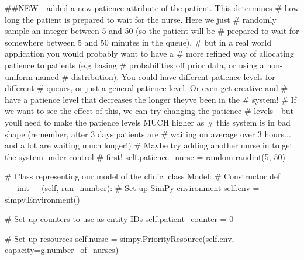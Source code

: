 \documentclass[
  letterpaper,
  DIV=11,
  numbers=noendperiod]{scrreprt}
\newenvironment{Shaded}{}{}
\newcommand{\CommentTok}[1]{\textcolor[rgb]{0.42,0.45,0.49}{#1}}
\newcommand{\DecValTok}[1]{\textcolor[rgb]{0.00,0.36,0.77}{#1}}
\newcommand{\FunctionTok}[1]{\textcolor[rgb]{0.44,0.26,0.76}{#1}}
\newcommand{\KeywordTok}[1]{\textcolor[rgb]{0.84,0.23,0.29}{#1}}
\newcommand{\NormalTok}[1]{\textcolor[rgb]{0.14,0.16,0.18}{#1}}
\newcommand{\OperatorTok}[1]{\textcolor[rgb]{0.14,0.16,0.18}{#1}}
\newcommand{\VariableTok}[1]{\textcolor[rgb]{0.89,0.38,0.04}{#1}}
\begin{document}
\begin{tcolorbox}
\begin{Shaded}
\begin{Highlighting}[]
        \CommentTok{\#\#NEW {-} added a new patience attribute of the patient.  This determines}
        \CommentTok{\# how long the patient is prepared to wait for the nurse.  Here we just}
        \CommentTok{\# randomly sample an integer between 5 and 50 (so the patient will be}
        \CommentTok{\# prepared to wait for somewhere between 5 and 50 minutes in the queue),}
        \CommentTok{\# but in a real world application you would probably want to have a}
        \CommentTok{\# more refined way of allocating patience to patients (e.g basing}
        \CommentTok{\# probabilities off prior data, or using a non{-}uniform named}
        \CommentTok{\# distribution).  You could have different patience levels for different}
        \CommentTok{\# queues, or just a general patience level.  Or even get creative and}
        \CommentTok{\# have a patience level that decreases the longer they\textquotesingle{}ve been in the}
        \CommentTok{\# system!}
        \CommentTok{\# If we want to see the effect of this, we can try changing the patience}
        \CommentTok{\# levels {-} but you\textquotesingle{}ll need to make the patience levels MUCH higher as}
        \CommentTok{\# this system is in bad shape (remember, after 3 days patients are}
        \CommentTok{\# waiting on average over 3 hours... and a lot are waiting much longer!)}
        \CommentTok{\# Maybe try adding another nurse in to get the system under control}
        \CommentTok{\# first!}
        \VariableTok{self}\NormalTok{.patience\_nurse }\OperatorTok{=}\NormalTok{ random.randint(}\DecValTok{5}\NormalTok{, }\DecValTok{50}\NormalTok{)}

\CommentTok{\# Class representing our model of the clinic.}
\KeywordTok{class}\NormalTok{ Model:}
    \CommentTok{\# Constructor}
    \KeywordTok{def} \FunctionTok{\_\_init\_\_}\NormalTok{(}\VariableTok{self}\NormalTok{, run\_number):}
        \CommentTok{\# Set up SimPy environment}
        \VariableTok{self}\NormalTok{.env }\OperatorTok{=}\NormalTok{ simpy.Environment()}

        \CommentTok{\# Set up counters to use as entity IDs}
        \VariableTok{self}\NormalTok{.patient\_counter }\OperatorTok{=} \DecValTok{0}

        \CommentTok{\# Set up resources}
        \VariableTok{self}\NormalTok{.nurse }\OperatorTok{=}\NormalTok{ simpy.PriorityResource(}\VariableTok{self}\NormalTok{.env,}
\NormalTok{                                            capacity}\OperatorTok{=}\NormalTok{g.number\_of\_nurses)}


\end{Highlighting}
\end{Shaded}
\end{tcolorbox}
\end{document}
